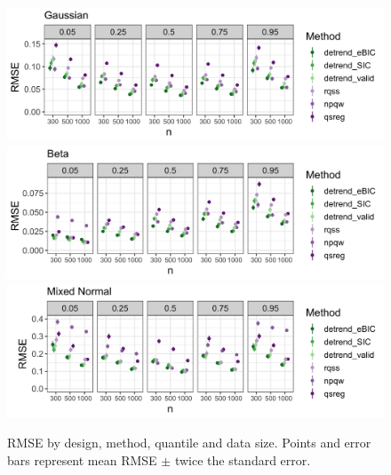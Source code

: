 \documentclass[12pt]{article}
\begin{document}
	\begin{figure}
		\includegraphics[width=\linewidth]{Figures/gaus_mse.png}	
		\includegraphics[width=\linewidth]{Figures/shapebeta_mse.png}
		\includegraphics[width=\linewidth]{Figures/mixednorm_mse.png}
		\caption{RMSE by design, method, quantile and data size. Points and error bars represent mean RMSE $\pm$ twice the standard error.}
		\label{fig:quantile_mse}
	\end{figure}
\end{document}
